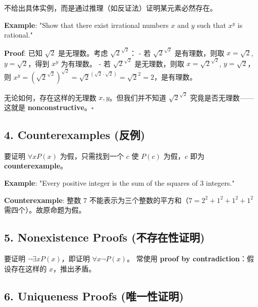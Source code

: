 \documentclass[10pt,a4paper,openany]{ctexbook}
\theoremstyle{definition}
\theoremstyle{remark}
\renewenvironment{quote}
  {\list{}{\leftmargin=1em\rightmargin=0pt\topsep=0.5pt\partopsep=0pt}\item[]}
  {\endlist}
\begin{document}
\begin{quote}
不给出具体实例，而是通过推理（如反证法）证明某元素必然存在。

\textbf{Example}: "Show that there exist irrational numbers $x$ and $y$ such that $x^y$ is rational."

\textbf{Proof}: 已知 $\sqrt{2}$ 是无理数。考虑 $\sqrt{2}^{\sqrt{2}}$：
- 若 $\sqrt{2}^{\sqrt{2}}$ 是有理数，则取 $x = \sqrt{2}$, $y = \sqrt{2}$，得到 $x^y$ 为有理数。
- 若 $\sqrt{2}^{\sqrt{2}}$ 是无理数，则取 $x = \sqrt{2}^{\sqrt{2}}$, $y = \sqrt{2}$，则 $x^y = (\sqrt{2}^{\sqrt{2}})^{\sqrt{2}} = \sqrt{2}^{(\sqrt{2} \cdot \sqrt{2})} = \sqrt{2}^2 = 2$，是有理数。

无论如何，存在这样的无理数 $x,y$。但我们并不知道 $\sqrt{2}^{\sqrt{2}}$ 究竟是否无理数——这就是 \textbf{nonconstructive}。$\square$

\end{quote}
\vspace{-2pt}

\subsection{4. Counterexamples (反例)}

\begin{quote}
要证明 $\forall x P(x)$ 为假，只需找到一个 $c$ 使 $P(c)$ 为假，$c$ 即为 \textbf{counterexample}。

\textbf{Example}: "Every positive integer is the sum of the squares of 3 integers."

\textbf{Counterexample}: 整数 $7$ 不能表示为三个整数的平方和（$7 = 2^2 + 1^2 + 1^2 + 1^2$ 需四个）。故原命题为假。

\end{quote}
\vspace{-2pt}

\subsection{5. Nonexistence Proofs (不存在性证明)}

要证明 $\neg \exists x P(x)$，即证明 $\forall x \neg P(x)$。
常使用 \textbf{proof by contradiction}：假设存在这样的 $x$，推出矛盾。
\vspace{-2pt}

\subsection{6. Uniqueness Proofs (唯一性证明)}
\end{document}
